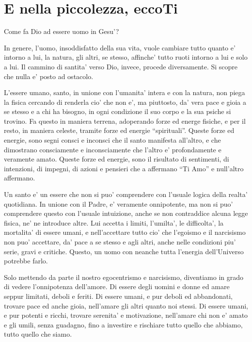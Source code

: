 \section{E nella piccolezza, eccoTi}
\label{DioPadreOnnipotenteDef}

Come fa Dio ad essere uomo in Gesu'?

In genere, l'uomo, insoddisfatto della sua vita, vuole cambiare tutto quanto e' intorno a lui, la natura, gli altri, se stesso, affinche' tutto ruoti intorno a lui e solo a lui. Il cammino di santita' verso Dio, invece, procede diversamente. Si scopre che nulla e' posto ad ostacolo. 

L'essere umano, santo, in unione con l'umanita' intera e con la natura, non piega la fisica cercando di renderla cio' che non e', ma piuttosto, da' vera pace e gioia a se stesso e a chi ha bisogno, in ogni condizione il suo corpo e la sua psiche si trovino. Fa questo in maniera terrena, adoperando forze ed energe fisiche, e per il resto, in maniera celeste, tramite forze ed energie ``spirituali''. Queste forze ed energie, sono segni consci e inconsci che il santo manifesta all'altro, e che dimostrano consciamente e inconsciamente che l'altro e' profondamente e veramente amato. Queste forze ed energie, sono il risultato di sentimenti, di intenzioni, di impegni, di azioni e pensieri che a affermano ``Ti Amo'' e null'altro affermano.

Un santo e' un essere che non si puo' comprendere con l'usuale logica della realta' quotidiana. In unione con il Padre, e' veramente onnipotente, ma non si puo' comprendere questo con l'usuale intuizione, anche se non contraddice alcuna legge fisica, ne' ne introduce altre. Lui accetta i limiti, l'umilta', le difficolta', la mortalita' di essere umani, e nell'accettare tutto cio' che l'egoismo e il narcisismo non puo' accettare, da' pace a se stesso e agli altri, anche nelle condizioni piu' serie, gravi e critiche. Questo, un uomo con neanche tutta l'energia dell'Universo potrebbe farlo.

Solo mettendo da parte il nostro egocentrismo e narcisismo, diventiamo in grado di vedere l'onnipotenza dell'amore. Di essere degli uomini e donne ed amare seppur limitati, deboli e feriti. Di essere umani, e pur deboli ed abbandonati, trovare pace ed anche gioia, nell'amare gli altri quanto noi stessi. Di essere umani, e pur potenti e ricchi, trovare serenita' e motivazione, nell'amare chi non e' amato e gli umili, senza guadagno, fino a investire e rischiare tutto quello che abbiamo, tutto quello che siamo.

